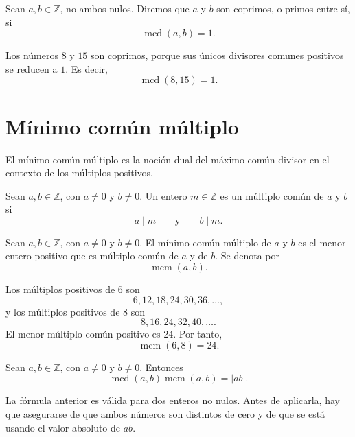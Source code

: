 \begin{definicion}
Sean \(a,b\in\mathbb{Z}\), no ambos nulos. Diremos que \(a\) y \(b\) son coprimos, o primos entre sí, si
\[
\operatorname{mcd}(a,b)=1.
\]
\end{definicion}

\begin{ejemplo}
Los números \(8\) y \(15\) son coprimos, porque sus únicos divisores comunes positivos se reducen a \(1\). Es decir,
\[
\operatorname{mcd}(8,15)=1.
\]
\end{ejemplo}

\section{Mínimo común múltiplo}

El mínimo común múltiplo es la noción dual del máximo común divisor en el contexto de los múltiplos positivos.

\begin{definicion}
Sean \(a,b\in\mathbb{Z}\), con \(a\neq 0\) y \(b\neq 0\). Un entero \(m\in\mathbb{Z}\) es un múltiplo común de \(a\) y \(b\) si
\[
a\mid m
\qquad\text{y}\qquad
b\mid m.
\]
\end{definicion}

\begin{definicion}
Sean \(a,b\in\mathbb{Z}\), con \(a\neq 0\) y \(b\neq 0\). El mínimo común múltiplo de \(a\) y \(b\) es el menor entero positivo que es múltiplo común de \(a\) y de \(b\). Se denota por
\[
\operatorname{mcm}(a,b).
\]
\end{definicion}

\begin{ejemplo}
Los múltiplos positivos de \(6\) son
\[
6,12,18,24,30,36,\ldots,
\]
y los múltiplos positivos de \(8\) son
\[
8,16,24,32,40,\ldots.
\]
El menor múltiplo común positivo es \(24\). Por tanto,
\[
\operatorname{mcm}(6,8)=24.
\]
\end{ejemplo}

\begin{proposicion}
Sean \(a,b\in\mathbb{Z}\), con \(a\neq 0\) y \(b\neq 0\). Entonces
\[
\operatorname{mcd}(a,b)\operatorname{mcm}(a,b)=|ab|.
\]
\end{proposicion}

\begin{advertencia}
La fórmula anterior es válida para dos enteros no nulos. Antes de aplicarla, hay que asegurarse de que ambos números son distintos de cero y de que se está usando el valor absoluto de \(ab\).
\end{advertencia}

